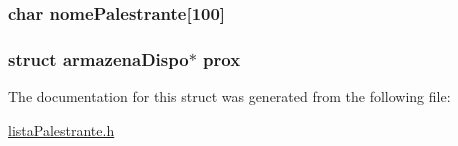 \subsubsection[{nome\+Palestrante}]{\setlength{\rightskip}{0pt plus 5cm}char nome\+Palestrante\mbox{[}100\mbox{]}}\label{structarmazena_dispo_af31dd10e6cbda382c5fcb72a1d7e34ff}
\hypertarget{structarmazena_dispo_a554d0729e872d59403b779eb4fe5ad83}{}
\subsubsection[{prox}]{\setlength{\rightskip}{0pt plus 5cm}struct {\bf armazena\+Dispo}$\ast$ prox}\label{structarmazena_dispo_a554d0729e872d59403b779eb4fe5ad83}


The documentation for this struct was generated from the following file\+:\begin{DoxyCompactItemize}
\item 
\hyperlink{lista_palestrante_8h}{lista\+Palestrante.\+h}\end{DoxyCompactItemize}
